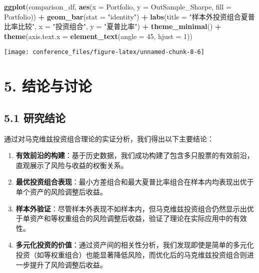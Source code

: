 \documentclass[
]{article}
\newenvironment{Shaded}{\begin{snugshade}}{\end{snugshade}}
\newcommand{\AttributeTok}[1]{\textcolor[rgb]{0.13,0.29,0.53}{#1}}
\newcommand{\DecValTok}[1]{\textcolor[rgb]{0.00,0.00,0.81}{#1}}
\newcommand{\FunctionTok}[1]{\textcolor[rgb]{0.13,0.29,0.53}{\textbf{#1}}}
\newcommand{\NormalTok}[1]{#1}
\newcommand{\SpecialCharTok}[1]{\textcolor[rgb]{0.81,0.36,0.00}{\textbf{#1}}}
\newcommand{\StringTok}[1]{\textcolor[rgb]{0.31,0.60,0.02}{#1}}
\begin{document}
\begin{Shaded}
\begin{Highlighting}[]
\FunctionTok{ggplot}\NormalTok{(comparison\_df, }\FunctionTok{aes}\NormalTok{(}\AttributeTok{x =}\NormalTok{ Portfolio, }\AttributeTok{y =}\NormalTok{ OutSample\_Sharpe, }\AttributeTok{fill =}\NormalTok{ Portfolio)) }\SpecialCharTok{+}
  \FunctionTok{geom\_bar}\NormalTok{(}\AttributeTok{stat =} \StringTok{"identity"}\NormalTok{) }\SpecialCharTok{+}
  \FunctionTok{labs}\NormalTok{(}\AttributeTok{title =} \StringTok{"样本外投资组合夏普比率比较"}\NormalTok{,}
       \AttributeTok{x =} \StringTok{"投资组合"}\NormalTok{,}
       \AttributeTok{y =} \StringTok{"夏普比率"}\NormalTok{) }\SpecialCharTok{+}
  \FunctionTok{theme\_minimal}\NormalTok{() }\SpecialCharTok{+}
  \FunctionTok{theme}\NormalTok{(}\AttributeTok{axis.text.x =} \FunctionTok{element\_text}\NormalTok{(}\AttributeTok{angle =} \DecValTok{45}\NormalTok{, }\AttributeTok{hjust =} \DecValTok{1}\NormalTok{))}
\end{Highlighting}
\end{Shaded}

\begin{center}\texttt{[image: conference\_files/figure-latex/unnamed-chunk-8-6]} \end{center}

\section{5. 结论与讨论}\label{ux7ed3ux8bbaux4e0eux8ba8ux8bba}

\subsection{5.1 研究结论}\label{ux7814ux7a76ux7ed3ux8bba}

通过对马克维兹投资组合理论的实证分析，我们得出以下主要结论：

\begin{enumerate}
\def\labelenumi{\arabic{enumi}.}
\item
  \textbf{有效前沿的构建}：基于历史数据，我们成功构建了包含多只股票的有效前沿，直观展示了风险与收益的权衡关系。
\item
  \textbf{最优投资组合表现}：最小方差组合和最大夏普比率组合在样本内均表现出优于单个资产的风险调整后收益。
\item
  \textbf{样本外验证}：尽管样本外表现不如样本内，但马克维兹投资组合仍然显示出优于单资产和等权重组合的风险调整后收益，验证了理论在实际应用中的有效性。
\item
  \textbf{多元化投资的价值}：通过资产间的相关性分析，我们发现即使是简单的多元化投资（如等权重组合）也能显著降低风险，而优化后的马克维兹投资组合则进一步提升了风险调整后收益。
\end{enumerate}
\end{document}
